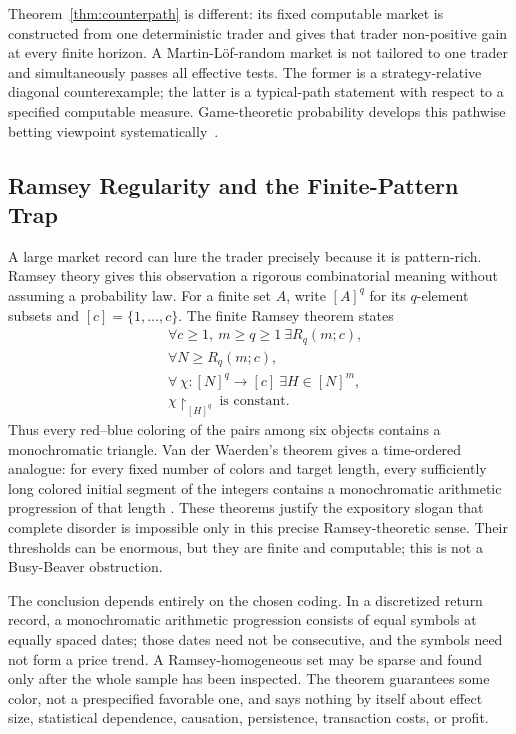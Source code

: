 \documentclass[aps,pra,reprint,superscriptaddress,amsmath,amssymb,floatfix]{revtex4-2}
\theoremstyle{plain}
\theoremstyle{definition}
\theoremstyle{remark}
\begin{document}
Theorem~\ref{thm:counterpath} is different: its fixed computable market is
constructed from one deterministic trader and gives that trader non-positive
gain at every finite horizon. A Martin-L\"of-random market is not tailored to
one trader and simultaneously passes all effective tests. The former is a
strategy-relative diagonal counterexample; the latter is a typical-path
statement with respect to a specified computable measure. Game-theoretic
probability develops this pathwise betting viewpoint
systematically~\cite{ShaferVovk2001}.

\subsection{Ramsey Regularity and the Finite-Pattern Trap}
\label{sec:ramseytrap}

A large market record can lure the trader precisely because it is
pattern-rich. Ramsey theory gives this observation a rigorous combinatorial
meaning without assuming a probability law. For a finite set \(A\), write
\([A]^q\) for its \(q\)-element subsets and \([c]=\{1,\ldots,c\}\). The finite
Ramsey theorem states
\begin{equation}
 \begin{aligned}
  &\forall c\geq1,\ m\geq q\geq1\ \exists R_q(m;c),\\
  &\forall N\geq R_q(m;c),\\
  &\forall\,\chi\colon[N]^q\to[c]\ \exists H\in[N]^m,\\
  &\chi\!\upharpoonright_{[H]^q}\ \text{is constant}.
 \end{aligned}
 \label{eq:finiteramsey}
\end{equation}
Thus every red--blue coloring of the pairs among six objects contains a
monochromatic triangle. Van der Waerden's theorem gives a time-ordered
analogue: for every fixed number of colors and target length, every
sufficiently long colored initial segment of the integers contains a
monochromatic arithmetic progression of that length
\cite{Ramsey-GRS-90,GS-90}. These theorems justify the expository slogan that
complete disorder is impossible only in this precise Ramsey-theoretic sense.
Their thresholds can be enormous, but they are finite and computable; this is
not a Busy-Beaver obstruction.

The conclusion depends entirely on the chosen coding. In a discretized return
record, a monochromatic arithmetic progression consists of equal symbols at
equally spaced dates; those dates need not be consecutive, and the symbols
need not form a price trend. A Ramsey-homogeneous set may be sparse and found
only after the whole sample has been inspected. The theorem guarantees some
color, not a prespecified favorable one, and says nothing by itself about
effect size, statistical dependence, causation, persistence, transaction
costs, or profit.
\end{document}
